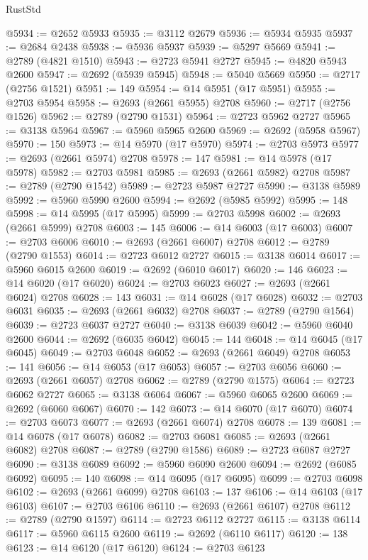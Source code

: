 \begin{lexlean}{RustStd}
\begin{coremodule}
@5934 := @2652 @5933
@5935 := @3112 @2679
@5936 := @5934 @5935
@5937 := @2684 @2438
@5938 := @5936 @5937
@5939 := @5297 @5669
@5941 := @2789 (@4821 @1510)
@5943 := @2723 @5941 @2727
@5945 := @4820 @5943 @2600
@5947 := @2692 (@5939 @5945)
@5948 := @5040 @5669
@5950 := @2717 (@2756 @1521)
@5951 := 149
@5954 := @14 @5951 (@17 @5951)
@5955 := @2703 @5954
@5958 := @2693 (@2661 @5955) @2708
@5960 := @2717 (@2756 @1526)
@5962 := @2789 (@2790 @1531)
@5964 := @2723 @5962 @2727
@5965 := @3138 @5964
@5967 := @5960 @5965 @2600
@5969 := @2692 (@5958 @5967)
@5970 := 150
@5973 := @14 @5970 (@17 @5970)
@5974 := @2703 @5973
@5977 := @2693 (@2661 @5974) @2708
@5978 := 147
@5981 := @14 @5978 (@17 @5978)
@5982 := @2703 @5981
@5985 := @2693 (@2661 @5982) @2708
@5987 := @2789 (@2790 @1542)
@5989 := @2723 @5987 @2727
@5990 := @3138 @5989
@5992 := @5960 @5990 @2600
@5994 := @2692 (@5985 @5992)
@5995 := 148
@5998 := @14 @5995 (@17 @5995)
@5999 := @2703 @5998
@6002 := @2693 (@2661 @5999) @2708
@6003 := 145
@6006 := @14 @6003 (@17 @6003)
@6007 := @2703 @6006
@6010 := @2693 (@2661 @6007) @2708
@6012 := @2789 (@2790 @1553)
@6014 := @2723 @6012 @2727
@6015 := @3138 @6014
@6017 := @5960 @6015 @2600
@6019 := @2692 (@6010 @6017)
@6020 := 146
@6023 := @14 @6020 (@17 @6020)
@6024 := @2703 @6023
@6027 := @2693 (@2661 @6024) @2708
@6028 := 143
@6031 := @14 @6028 (@17 @6028)
@6032 := @2703 @6031
@6035 := @2693 (@2661 @6032) @2708
@6037 := @2789 (@2790 @1564)
@6039 := @2723 @6037 @2727
@6040 := @3138 @6039
@6042 := @5960 @6040 @2600
@6044 := @2692 (@6035 @6042)
@6045 := 144
@6048 := @14 @6045 (@17 @6045)
@6049 := @2703 @6048
@6052 := @2693 (@2661 @6049) @2708
@6053 := 141
@6056 := @14 @6053 (@17 @6053)
@6057 := @2703 @6056
@6060 := @2693 (@2661 @6057) @2708
@6062 := @2789 (@2790 @1575)
@6064 := @2723 @6062 @2727
@6065 := @3138 @6064
@6067 := @5960 @6065 @2600
@6069 := @2692 (@6060 @6067)
@6070 := 142
@6073 := @14 @6070 (@17 @6070)
@6074 := @2703 @6073
@6077 := @2693 (@2661 @6074) @2708
@6078 := 139
@6081 := @14 @6078 (@17 @6078)
@6082 := @2703 @6081
@6085 := @2693 (@2661 @6082) @2708
@6087 := @2789 (@2790 @1586)
@6089 := @2723 @6087 @2727
@6090 := @3138 @6089
@6092 := @5960 @6090 @2600
@6094 := @2692 (@6085 @6092)
@6095 := 140
@6098 := @14 @6095 (@17 @6095)
@6099 := @2703 @6098
@6102 := @2693 (@2661 @6099) @2708
@6103 := 137
@6106 := @14 @6103 (@17 @6103)
@6107 := @2703 @6106
@6110 := @2693 (@2661 @6107) @2708
@6112 := @2789 (@2790 @1597)
@6114 := @2723 @6112 @2727
@6115 := @3138 @6114
@6117 := @5960 @6115 @2600
@6119 := @2692 (@6110 @6117)
@6120 := 138
@6123 := @14 @6120 (@17 @6120)
@6124 := @2703 @6123

\end{coremodule}
\end{lexlean}
